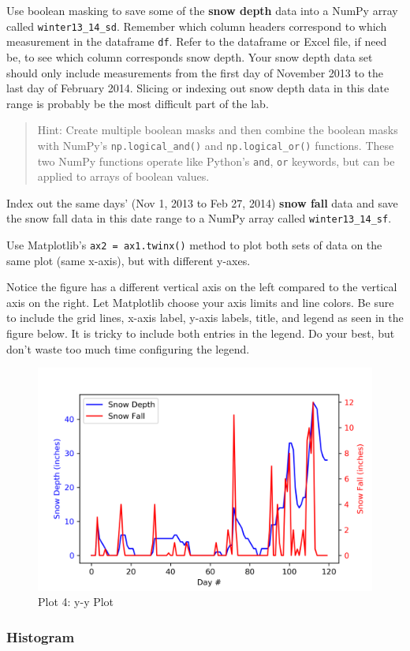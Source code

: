 \documentclass[11pt]{article}
\makeatletter
\def\maxwidth{\ifdim\Gin@nat@width>\linewidth\linewidth
    \else\Gin@nat@width\fi}
\let\Oldincludegraphics\includegraphics
\renewcommand{\includegraphics}[1]{\Oldincludegraphics[width=.8\maxwidth]{#1}}
\makeatother
\begin{document}
Use boolean masking to save some of the \textbf{snow depth} data into a
NumPy array called \texttt{winter13\_14\_sd}. Remember which column
headers correspond to which measurement in the dataframe \texttt{df}.
Refer to the dataframe or Excel file, if need be, to see which column
corresponds snow depth. Your snow depth data set should only include
measurements from the first day of November 2013 to the last day of
February 2014. Slicing or indexing out snow depth data in this date
range is probably be the most difficult part of the lab.

\begin{quote}
Hint: Create multiple boolean masks and then combine the boolean masks
with NumPy's \texttt{np.logical\_and()} and \texttt{np.logical\_or()}
functions. These two NumPy functions operate like Python's \texttt{and},
\texttt{or} keywords, but can be applied to arrays of boolean values.
\end{quote}

Index out the same days' (Nov 1, 2013 to Feb 27, 2014) \textbf{snow
fall} data and save the snow fall data in this date range to a NumPy
array called \texttt{winter13\_14\_sf}.

Use Matplotlib's \texttt{ax2\ =\ ax1.twinx()} method to plot both sets
of data on the same plot (same x-axis), but with different y-axes.

Notice the figure has a different vertical axis on the left compared to
the vertical axis on the right. Let Matplotlib choose your axis limits
and line colors. Be sure to include the grid lines, x-axis label, y-axis
labels, title, and legend as seen in the figure below. It is tricky to
include both entries in the legend. Do your best, but don't waste too
much time configuring the legend.

\begin{figure}[h!]
\centering
\includegraphics{images/yyplot.png}
\caption{Plot 4: y-y Plot}
\end{figure}
\newpage
    \hypertarget{histogram}{%
\subsubsection{Histogram}\label{histogram}}
\end{document}
